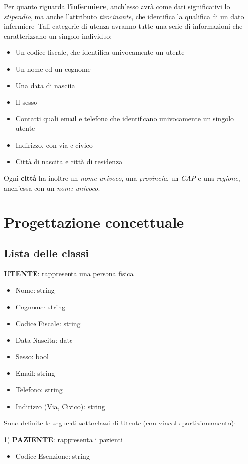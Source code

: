 \documentclass{report}
\begin{document}
Per quanto riguarda l'\textbf{infermiere}, anch'esso avrà come dati significativi lo \textit{stipendio}, ma anche l'attributo \textit{tirocinante}, che identifica la qualifica di un dato infermiere. Tali categorie di utenza avranno tutte una serie di informazioni che caratterizzano un singolo individuo:
\begin{itemize}
\item Un codice fiscale, che identifica univocamente un utente
\item Un nome ed un cognome
\item Una data di nascita
\item Il sesso
\item Contatti quali email e telefono che identificano univocamente un singolo utente
\item Indirizzo, con via e civico
\item Città di nascita e città di residenza
\end{itemize}
Ogni \textbf{città} ha inoltre un \textit{nome univoco}, una \textit{provincia}, un \textit{CAP} e una \textit{regione}, anch'essa con un \textit{nome univoco}. 

\section*{Progettazione concettuale}
\subsection*{Lista delle classi}

\textbf{UTENTE}: rappresenta una persona fisica
\begin{itemize}
\item Nome: string
\item Cognome: string
\item Codice Fiscale: string
\item Data Nascita: date
\item Sesso: bool
\item Email: string
\item Telefono: string
\item Indirizzo (Via, Civico): string
\end{itemize}

Sono definite le seguenti sottoclassi di Utente (con vincolo partizionamento):

1) \textbf{PAZIENTE}: rappresenta i pazienti 
\begin{itemize}
\item Codice Esenzione: string
\end{itemize}
\end{document}
